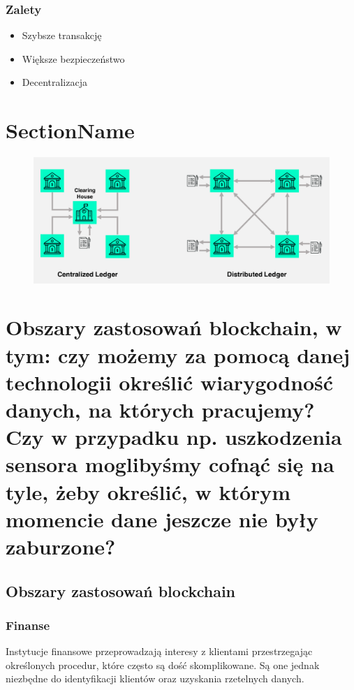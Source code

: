 \documentclass[12pt]{article}
\newenvironment{centerfig}
{\begin{figure}[H]\centering}
{\end{figure}}
\begin{document}
\subsubsection{Zalety}
\begin{itemize}
  \item Szybsze transakcję
  \item Większe bezpieczeństwo
  \item Decentralizacja
\end{itemize}

\section{SectionName}

\begin{centerfig}
  \includegraphics[width=\textwidth]{1.png}
\end{centerfig}

\section{Obszary zastosowań blockchain, w tym: czy możemy za pomocą danej
technologii określić wiarygodność danych, na których pracujemy? Czy w przypadku np. uszkodzenia sensora moglibyśmy cofnąć się na tyle, żeby określić, w którym momencie dane jeszcze nie były zaburzone?}

\subsection{Obszary zastosowań blockchain}
\subsubsection{Finanse}
Instytucje finansowe przeprowadzają interesy z klientami przestrzegając określonych procedur, które często są dość skomplikowane. Są one jednak niezbędne do identyfikacji klientów oraz uzyskania rzetelnych danych.
\end{document}
